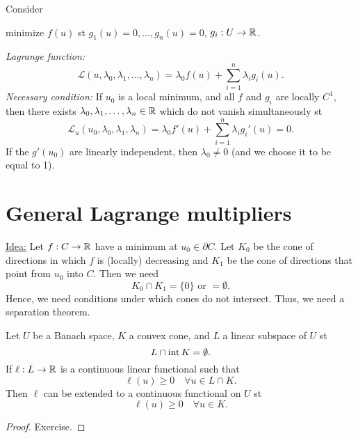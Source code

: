 \documentclass[../skript.tex]{subfiles}
\begin{document}
\begin{example} %
Consider
\label{ex:c1e33}
\begin{problemnonumb}
minimize $f(u)$ \ac{st} $g_1(u) = 0, \ldots, g_n(u) = 0$, $g_i : U \to \mathbb{R}$.
\end{problemnonumb}
\emph{Lagrange function:}
\[
	\mathcal{L}(u, \lambda_0, \lambda_1, \ldots, \lambda_n) = \lambda_0 f(u) + \sum_{i=1}^n \lambda_i g_i(u).
\]
\emph{Necessary condition:}
If $u_0$ is a local minimum, and all $f$ and $g_i$ are locally $C^1$, then there exists $\lambda_0, \lambda_1, \ldots, \lambda_n \in \mathbb{R}$ which do not vanish simultaneously \ac{st}
\[
	\mathcal{L}_u(u_0, \lambda_0, \lambda_1, \lambda_n) = \lambda_0 f'(u) + \sum_{i=1}^n \lambda_i g_i'(u) = 0.
\]
If the $g'(u_0)$ are linearly independent, then $\lambda_0 \neq 0$ (and we choose it to be equal to 1).
\end{example}
\section{General Lagrange multipliers} %
\label{sec:c1e4}
\underline{Idea:} Let $f : C \to \mathbb{R}$ have a minimum at $u_0 \in \partial C$. Let $K_0$ be the cone of directions in which $f$ is (locally) decreasing and $K_1$ be the cone of directions that point from $u_0$ into $C$. Then we need
\[
	K_0 \cap K_1 = \{ 0 \} \text{ or } = \emptyset.
\]
Hence, we need conditions under which cones do not intersect. Thus, we need a separation theorem.
\begin{proposition} %
\label{prop:c1e34}
Let $U$ be a Banach space, $K$ a convex cone, and $L$ a linear subspace of $U$ \ac{st}
\[
	L \cap \operatorname{int} K = \emptyset.
\]
If $\ell : L \to \mathbb{R}$ is a continuous linear functional such that
\[
	\ell(u) \geq 0 \quad \forall u \in L \cap K.
\]
Then $\ell$ can be extended to a continuous functional on $U$ \ac{st}
\[
	\ell(u) \geq 0 \quad \forall u \in K.
\]
\end{proposition}
\begin{proof}
Exercise.
\end{proof}
\end{document}
